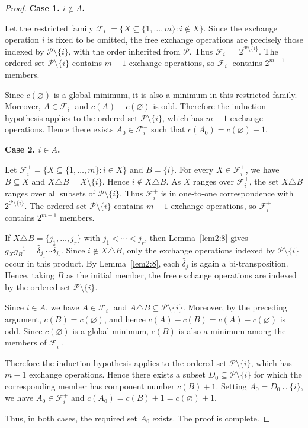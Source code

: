 \documentclass[10pt,a4paper]{amsart}
\begin{document}
\begin{proof}
\medskip
\noindent\textbf{Case 1. $i\notin A$.}

Let the restricted family
$\mathcal F_i^-=\{X\subseteq\{1,\ldots,m\}:i\notin X\}$.
Since the exchange operation $i$ is fixed to be omitted, the free
exchange operations are precisely those indexed by
$\mathcal P\setminus\{i\}$, with the order inherited from
$\mathcal P$. Thus
$\mathcal F_i^-=2^{\mathcal P\setminus\{i\}}$.
The ordered set $\mathcal P\setminus\{i\}$ contains $m-1$ exchange
operations, so $\mathcal F_i^-$  contains $2^{m-1}$
members.

Since $c(\varnothing)$ is a global minimum, it is also a minimum in
this restricted family. Moreover, $A\in\mathcal F_i^-$ and
$c(A)-c(\varnothing)$ is odd. Therefore the induction hypothesis
applies to the ordered set $\mathcal P\setminus\{i\}$, which has
$m-1$ exchange operations. Hence there exists
$A_0\in\mathcal F_i^-$ such that
$c(A_0)=c(\varnothing)+1$.

\medskip
\noindent\textbf{Case 2. $i\in A$.}

Let $\mathcal F_i^+=\{X\subseteq\{1,\ldots,m\}:i\in X\}$ and
$B=\{i\}$. For every $X\in\mathcal F_i^+$, we have $B\subseteq X$
and $X\triangle B=X\setminus\{i\}$. Hence
$i\notin X\triangle B$. As $X$ ranges over
$\mathcal F_i^+$, the set $X\triangle B$ ranges over all subsets of
$\mathcal P\setminus\{i\}$. Thus $\mathcal F_i^+$ is in one-to-one
correspondence with $2^{\mathcal P\setminus\{i\}}$. The ordered set
$\mathcal P\setminus\{i\}$ contains $m-1$ exchange operations, so
$\mathcal F_i^+$ contains $2^{m-1}$ members.

If $X\triangle B=\{j_1,\ldots,j_r\}$ with
$j_1<\cdots<j_r$, then Lemma~\ref{lem2:8} gives
$g_Xg_B^{-1}
=\widehat\delta_{j_1}\cdots\widehat\delta_{j_r}$.
Since $i\notin X\triangle B$, only the exchange operations indexed by
$\mathcal P\setminus\{i\}$ occur in this product. By
Lemma~\ref{lem2:8}, each $\widehat\delta_j$ is again a
bi-transposition. Hence, taking $B$ as the initial member, the free
exchange operations are indexed by the ordered set
$\mathcal P\setminus\{i\}$.

Since $i\in A$, we have $A\in\mathcal F_i^+$ and
$A\triangle B\subseteq\mathcal P\setminus\{i\}$. Moreover, by the
preceding argument, $c(B)=c(\varnothing)$, and hence
$c(A)-c(B)=c(A)-c(\varnothing)$ is odd. Since
$c(\varnothing)$ is a global minimum, $c(B)$ is also a minimum among
the members of $\mathcal F_i^+$.

Therefore the induction hypothesis applies to the ordered set
$\mathcal P\setminus\{i\}$, which has $m-1$ exchange operations. Hence
there exists a subset $D_0\subseteq\mathcal P\setminus\{i\}$ for which
the corresponding member has component number $c(B)+1$. Setting
$A_0=D_0\cup\{i\}$, we have $A_0\in\mathcal F_i^+$ and
$c(A_0)=c(B)+1=c(\varnothing)+1$.

Thus, in both cases, the required set $A_0$ exists.  The proof is complete.
\end{proof}
\end{document}
